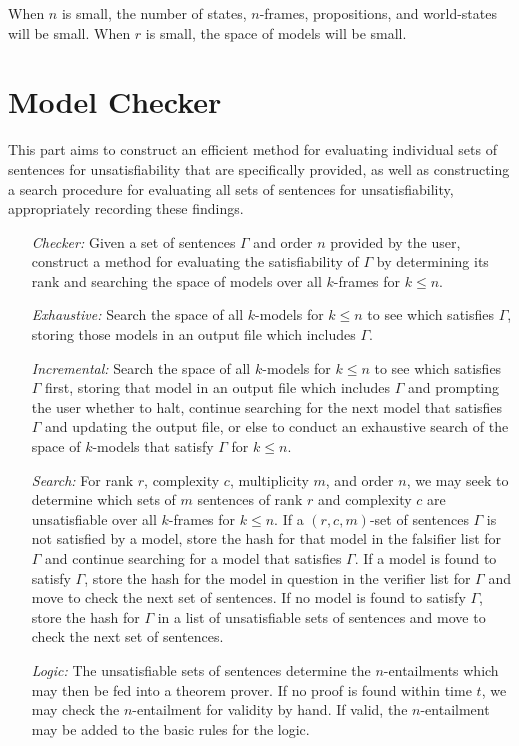 \documentclass[a4paper, 11pt]{article} %
\begin{document}
\noindent
When $n$ is small, the number of states, $n$-frames, propositions, and world-states will be small.
When $r$ is small, the space of models will be small.




\section{Model Checker}

This part aims to construct an efficient method for evaluating individual sets of sentences for unsatisfiability that are specifically provided, as well as constructing a search procedure for evaluating all sets of sentences for unsatisfiability, appropriately recording these findings.

\begin{enumerate}
  \item[\it Checker:] Given a set of sentences $\Gamma$ and order $n$ provided by the user, construct a method for evaluating the satisfiability of $\Gamma$ by determining its rank and searching the space of models over all $k$-frames for $k\leq n$.
  \item[\it Exhaustive:] Search the space of all $k$-models for $k\leq n$ to see which satisfies $\Gamma$, storing those models in an output file which includes $\Gamma$. 
  \item[\it Incremental:] Search the space of all $k$-models for $k\leq n$ to see which satisfies $\Gamma$ first, storing that model in an output file which includes $\Gamma$ and prompting the user whether to halt, continue searching for the next model that satisfies $\Gamma$ and updating the output file, or else to conduct an exhaustive search of the space of $k$-models that satisfy $\Gamma$ for $k\leq n$.
  \item[\it Search:] For rank $r$, complexity $c$, multiplicity $m$, and order $n$, we may seek to determine which sets of $m$ sentences of rank $r$ and complexity $c$ are unsatisfiable over all $k$-frames for $k\leq n$. If a $(r,c,m)$-set of sentences $\Gamma$ is not satisfied by a model, store the hash for that model in the falsifier list for $\Gamma$ and continue searching for a model that satisfies $\Gamma$. If a model is found to satisfy $\Gamma$, store the hash for the model in question in the verifier list for $\Gamma$ and move to check the next set of sentences. If no model is found to satisfy $\Gamma$, store the hash for $\Gamma$ in a list of unsatisfiable sets of sentences and move to check the next set of sentences. 
  \item[\it Logic:] The unsatisfiable sets of sentences determine the $n$-entailments which may then be fed into a theorem prover. If no proof is found within time $t$, we may check the $n$-entailment for validity by hand. If valid, the $n$-entailment may be added to the basic rules for the logic.
\end{enumerate}
\end{document}
